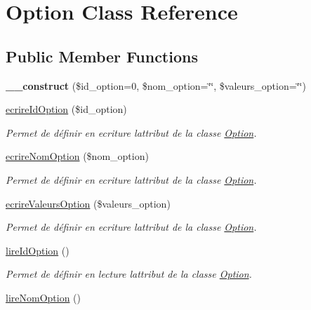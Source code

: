 \hypertarget{class_option}{}\section{Option Class Reference}
\label{class_option}
\subsection*{Public Member Functions}
\begin{DoxyCompactItemize}
\item 
\mbox{\label{class_option_aec2859deea003ce4c4a1d9d173daf2bb}} 
{\bfseries \+\_\+\+\_\+construct} (\$id\+\_\+option=0, \$nom\+\_\+option=\char`\"{}\char`\"{}, \$valeurs\+\_\+option=\char`\"{}\char`\"{})
\item 
\hyperlink{class_option_a1270d4e227cf6006b0797c2e3dda967b}{ecrire\+Id\+Option} (\$id\+\_\+option)
\begin{DoxyCompactList}\small\item\em Permet de définir en ecriture l\textquotesingle{}attribut de la classe \hyperlink{class_option}{Option}. \end{DoxyCompactList}\item 
\hyperlink{class_option_af4d726fee7376c202bce7b38dab30bc8}{ecrire\+Nom\+Option} (\$nom\+\_\+option)
\begin{DoxyCompactList}\small\item\em Permet de définir en ecriture l\textquotesingle{}attribut de la classe \hyperlink{class_option}{Option}. \end{DoxyCompactList}\item 
\hyperlink{class_option_ad771adcf22b0133117ff87d5f04a51ad}{ecrire\+Valeurs\+Option} (\$valeurs\+\_\+option)
\begin{DoxyCompactList}\small\item\em Permet de définir en ecriture l\textquotesingle{}attribut de la classe \hyperlink{class_option}{Option}. \end{DoxyCompactList}\item 
\hyperlink{class_option_aa52b0c018581de4d363643512ced3363}{lire\+Id\+Option} ()
\begin{DoxyCompactList}\small\item\em Permet de définir en lecture l\textquotesingle{}attribut de la classe \hyperlink{class_option}{Option}. \end{DoxyCompactList}\item 
\hyperlink{class_option_a909b490d5001061c1085cd527d7e4120}{lire\+Nom\+Option} ()

\end{DoxyCompactItemize}
